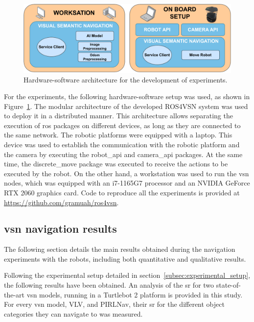 \begin{figure}
    \centering
    \includegraphics[width=\linewidth]{figures/ros4vsn/hw-sw-scheme}
    \caption{Hardware-software architecture for the development of experiments.}
    \label{fig:setup_experiment}
\end{figure}

For the experiments, the following hardware-software setup was used, as shown in Figure~\ref{fig:setup_experiment}.
The modular architecture of the developed ROS4VSN system was used to deploy it in a distributed manner.
This architecture allows separating the execution of \acrshort{ros} packages on different devices, as long as they are connected to the same network.
The robotic platforms were equipped with a laptop.
This device was used to establish the communication with the robotic platform and the camera by executing the robot\_api and camera\_api packages.
At the same time, the discrete\_move package was executed to receive the actions to be executed by the robot.
On the other hand, a workstation was used to run the \acrshort{vsn} nodes, which was equipped with an i7-1165G7 processor and an NVIDIA GeForce RTX 2060 graphics card.
Code to reproduce all the experiments is provided at \url{https://github.com/gramuah/ros4vsn}.

\subsection{\acrshort{vsn} navigation results}
\label{subsec:vsn}
The following section details the main results obtained during the navigation experiments with the robots, including both quantitative and qualitative results.

Following the experimental setup detailed in section~\ref{subsec:experimental_setup}, the following results have been obtained.
An analysis of the \acrshort{sr} for two state-of-the-art \acrshort{vsn} models, running in a Turtlebot 2 platform is provided in this study.
For every \acrshort{vsn} model, \ie VLV, and PIRLNav, their \acrshort{sr} for the different object categories they can navigate to was measured.

